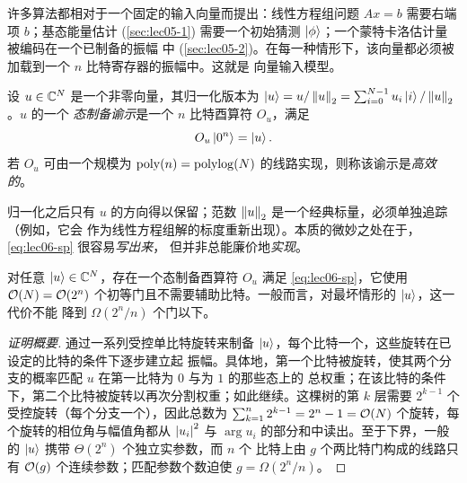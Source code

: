 许多算法都相对于一个固定的输入向量而提出：线性方程组问题 $Ax=b$ 需要右端项 $b$；基态能量估计
(\cref{sec:lec05-1}) 需要一个初始猜测 $\ket{\phi}$；一个蒙特卡洛估计量被编码在一个已制备的振幅
中 (\cref{sec:lec05-2})。在每一种情形下，该向量都必须被加载到一个 $n$ 比特寄存器的振幅中。这就是
向量输入模型。

\begin{definition}[态制备谕示]
\label{def:lec06-sp}
设 $u\in\mathbb{C}^{N}$ 是一个非零向量，其归一化版本为
$\ket{u}=u/\left\lVert u \right\rVert_2=\sum_{i=0}^{N-1}u_i\ket{i}/\left\lVert u \right\rVert_2$。$u$ 的一个
\emph{态制备谕示}是一个 $n$ 比特酉算符 $O_u$，满足
\begin{equation}
  O_u\ket{0^n}=\ket{u}.
  \label{eq:lec06-sp}
\end{equation}
若 $O_u$ 可由一个规模为 $\operatorname{poly}(n)=\operatorname{polylog}(N)$ 的线路实现，则称该谕示是\emph{高效的}。
\end{definition}

归一化之后只有 $u$ 的方向得以保留；范数 $\left\lVert u \right\rVert_2$ 是一个经典标量，必须单独追踪（例如，它会
作为线性方程组解的标度重新出现）。本质的微妙之处在于，\eqref{eq:lec06-sp} 很容易\emph{写出来}，
但并非总能廉价地\emph{实现}。

\begin{proposition}[精确振幅加载的代价]
\label{prop:lec06-sp}
对任意 $\ket{u}\in\mathbb{C}^{N}$，存在一个态制备酉算符 $O_u$ 满足 \eqref{eq:lec06-sp}，它使用
$\mathcal{O}(N)=\mathcal{O}(2^n)$ 个初等门且不需要辅助比特。一般而言，对最坏情形的 $\ket{u}$，这一代价不能
降到 $\Omega(2^n/n)$ 个门以下。
\end{proposition}

\begin{proof}[证明概要]
通过一系列受控单比特旋转来制备 $\ket{u}$，每个比特一个，这些旋转在已设定的比特的条件下逐步建立起
振幅。具体地，第一个比特被旋转，使其两个分支的概率匹配 $u$ 在第一比特为 $0$ 与为 $1$ 的那些态上的
总权重；在该比特的条件下，第二个比特被旋转以再次分割权重；如此继续。这棵树的第 $k$ 层需要
$2^{k-1}$ 个受控旋转（每个分支一个），因此总数为
$\sum_{k=1}^{n}2^{k-1}=2^{n}-1=\mathcal{O}(N)$ 个旋转，每个旋转的相位角与幅值角都从 $\left\lvert u_i \right\rvert^2$ 与
$\arg u_i$ 的部分和中读出。至于下界，一般的 $\ket{u}$ 携带 $\Theta(2^n)$ 个独立实参数，而 $n$ 个
比特上由 $g$ 个两比特门构成的线路只有 $\mathcal{O}(g)$ 个连续参数；匹配参数个数迫使 $g=\Omega(2^n/n)$。
\end{proof}


